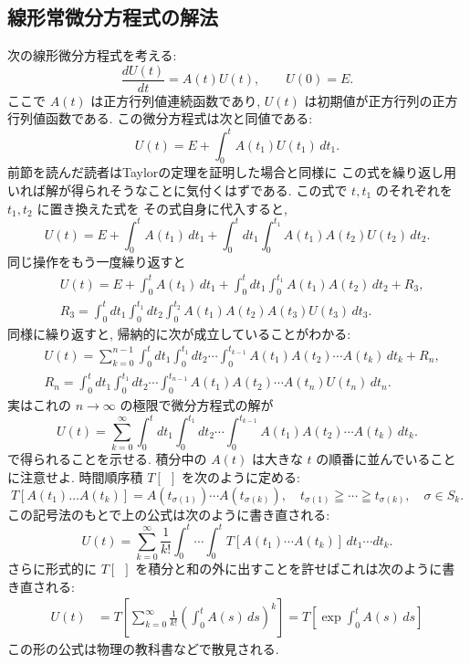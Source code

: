\documentclass[12pt,twoside]{jarticle}
\theoremstyle{jplain}
\theoremstyle{jplain}
\theoremstyle{jplain}
\numberwithin{theorem}{section}
\numberwithin{equation}{section}
\numberwithin{figure}{section}
\numberwithin{table}{section}
\begin{document}

\subsection{線形常微分方程式の解法}
\label{sec:LODE}

次の線形微分方程式を考える:
\[
\frac{dU(t)}{dt} = A(t)U(t), \qquad U(0)=E.
\]
ここで $A(t)$ は正方行列値連続函数であり, 
$U(t)$ は初期値が正方行列の正方行列値函数である.
この微分方程式は次と同値である:
\[
U(t) = E + \int_0^t A(t_1)U(t_1)\,dt_1.
\]
前節を読んだ読者はTaylorの定理を証明した場合と同様に
この式を繰り返し用いれば解が得られそうなことに気付くはずである.
この式で $t,t_1$ のそれぞれを $t_1,t_2$ に置き換えた式を
その式自身に代入すると, 
\[
U(t)=E+\int_0^t A(t_1)\,dt_1 + \int_0^t\!\!\!dt_1\int_0^{t_1}A(t_1)A(t_2)U(t_2)\,dt_2.
\]
同じ操作をもう一度繰り返すと
\begin{align*}
&
U(t)=E+\int_0^t A(t_1)\,dt_1
+\int_0^t\!\!\!dt_1\int_0^{t_1} A(t_1)A(t_2)\,dt_2
+R_3,
\\ &
R_3 = \int_0^t\!\!\!dt_1\int_0^{t_1}\!\!\!dt_2\int_0^{t_2}A(t_1)A(t_2)A(t_3)U(t_3)\,dt_3.
\end{align*}
同様に繰り返すと, 帰納的に次が成立していることがわかる:
\begin{align*}
&
U(t)=\sum_{k=0}^{n-1} 
\int_0^t\!\!\!dt_1\int_0^{t_1}\!\!\!dt_2\cdots\int_0^{t_{k-1}}
A(t_1)A(t_2)\cdots A(t_k)\,dt_k
+R_n,
\\ &
R_n=\int_0^t\!\!\!dt_1\int_0^{t_1}\!\!\!dt_2\cdots\int_0^{t_{n-1}}
A(t_1)A(t_2)\cdots A(t_n)U(t_n)\,dt_n.
\end{align*}
実はこれの $n\to\infty$ の極限で微分方程式の解が
\[
U(t)=\sum_{k=0}^\infty 
\int_0^t\!\!\!dt_1\int_0^{t_1}\!\!\!dt_2\cdots\int_0^{t_{k-1}}
A(t_1)A(t_2)\cdots A(t_k)\,dt_k.
\]
で得られることを示せる.
積分中の $A(t)$ は大きな $t$ の順番に並んでいることに注意せよ.
時間順序積 $T[\ \ ]$ を次のように定める:
\[
T[A(t_1)\ldots A(t_k)]
= A(t_{\sigma(1)})\cdots A(t_{\sigma(k)}),
\quad
t_{\sigma(1)}\geqq\cdots\geqq t_{\sigma(k)},
\quad
\sigma\in S_k.
\]
この記号法のもとで上の公式は次のように書き直される:
\[
U(t)=\sum_{k=0}^\infty\frac{1}{k!}\int_0^t\cdots\int_0^t T[A(t_1)\cdots A(t_k)]\,dt_1\cdots dt_k.
\]
さらに形式的に $T[\ \ ]$ を積分と和の外に出すことを許せばこれは次のように書き直される:
\begin{align*}
U(t)
&=T\left[
\sum_{k=0}^\infty \frac{1}{k!}
\left(\int_0^t A(s)\,ds\right)^k
\right]
=T\left[\exp\int_0^t A(s)\,ds \right]
\end{align*}
この形の公式は物理の教科書などで散見される.
\end{document}
